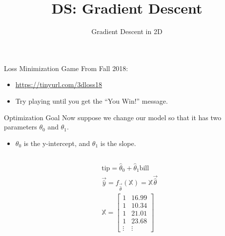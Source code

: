 \documentclass[aspectratio=169]{../latex_main/tntbeamer}  %
\title[Introduction]{DS: Gradient Descent}
\subtitle{Gradient Descent in 2D}
\begin{document}
	
	\maketitle
	\begin{frame}[c]{Loss Minimization Game}
	    From Fall 2018:
	    \begin{itemize}
	        \item \url{https://tinyurl.com/3dloss18}
	        \item Try playing until you get the “You Win!” message.
	    \end{itemize}
	\end{frame}
	
	
	\begin{frame}{Optimization Goal}
	    Now suppose we change our model so that it has two parameters $\theta_0$ and $\theta_1$.
	    \begin{itemize}
	        \item $\theta_0$ is the y-intercept, and $\theta_1$   is the slope.
	    \end{itemize}
	    \begin{columns}
	        \begin{column}{.5\textwidth}
	                \begin{align*}
	                     &\text{tip} = \hat{\theta}_0 + \hat{\theta}_1 \text{bill}\\
	                     &\Vec{\hat{y}}  = f_{\Vec{\hat{\theta}}}(\mathbb{X}) = \mathbb{X}\Vec{\hat{\theta}}\\
	                     &\mathbb{X} = \left[\begin{array}{cc}
	                                 1 & 16.99 \\
	                                 1 & 10.34 \\
	                                 1 & 21.01 \\
	                                 1 & 23.68 \\
	                                 \vdots & \vdots
	                        \end{array}\right]
	                 \end{align*}
	        \end{column}
	        

\end{columns}
\end{frame}
\end{document}
